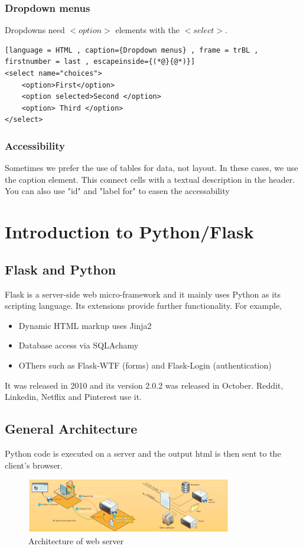 \documentclass[a4paper]{article}
\theoremstyle{plain}
\theoremstyle{definition}
\theoremstyle{remark}
\begin{document}
\begin{flushleft}
\subsubsection{Dropdown menus}
Dropdowns need $<option>$ elements with the $<select>$.
\begin{lstlisting}[language = HTML , caption={Dropdown menus} , frame = trBL , firstnumber = last , escapeinside={(*@}{@*)}]
<select name="choices">
	<option>First</option>
	<option selected>Second </option>
	<option> Third </option>
</select>	
\end{lstlisting}	
\subsubsection{Accessibility}
Sometimes we prefer the use of tables for data, not layout. In these cases, we use the caption element. This connect cells with a textual description in the header. You can also use "id" and "label for" to easen the accessability
\section{Introduction to Python/Flask}
\subsection{Flask and Python}
Flask is a server-side web micro-framework and it mainly uses Python as its scripting language. Its extensions provide further functionality. For example,
\begin{itemize}
	\item Dynamic HTML markup uses Jinja2
	\item Database access via SQLAchamy
	\item OThers such as Flask-WTF (forms) and Flask-Login (authentication)
\end{itemize}
It was released in 2010 and its version $2.0.2$ was released in October. Reddit, Linkedin, Netflix and Pinterest use it.
\subsection{General Architecture}
Python code is executed on a server and the output html is then sent to the client's browser.
\begin{figure}[H]
	\centering
	\includegraphics[width=0.8\textwidth]{architecture.png}
	\caption{Architecture of web server}
	\label{fig:architecture-png}
\end{figure}

\end{flushleft}
\end{document}
